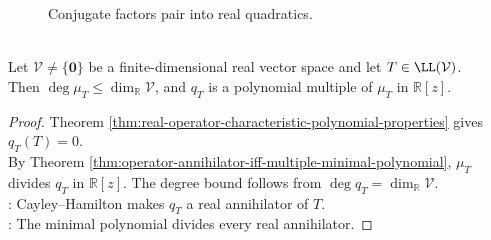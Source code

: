 \begin{figure}[H]
  \centering
  
  \caption{Conjugate factors pair into real quadratics.}
  \label{fig:real-characteristic-conjugate-pairs}
\end{figure}

\begin{corollary} \label{cor:real-characteristic-polynomial-multiple-minimal-polynomial} \\
Let $\mathcal{V}\neq\{\mathbf{0}\}$ be a finite-dimensional real vector space and let $T\in\LL(\mathcal{V})$.\\
Then $\deg\mu_T\leq\dim_{\mathbb{R}}\mathcal{V}$, and $q_T$ is a polynomial multiple of $\mu_T$ in $\mathbb{R}[z]$.
\begin{proof}
Theorem \ref{thm:real-operator-characteristic-polynomial-properties} gives $q_T(T)=0$.\\
By Theorem \ref{thm:operator-annihilator-iff-multiple-minimal-polynomial}, $\mu_T$ divides $q_T$ in $\mathbb{R}[z]$. The degree bound follows from $\deg q_T=\dim_{\mathbb{R}}\mathcal{V}$.\\
: Cayley--Hamilton makes $q_T$ a real annihilator of $T$.\\
: The minimal polynomial divides every real annihilator.
\end{proof}
\end{corollary}

